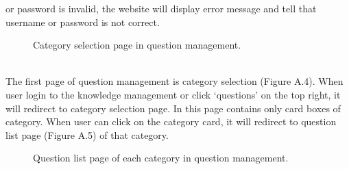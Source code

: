 \documentclass[12pt,oneside,openright,a4paper]{cpe-english-project}
\begin{document}
or password is invalid, the website will display error message and tell that username or 
password is not correct.
\begin{figure}[!h]\centering
{}
\caption{Category selection page in question management.
}\label{fig:Category selection page in question management.
}
\end{figure}\\

The first page of question management is category selection (Figure A.4). When user 
login to the knowledge management or click ‘questions’ on the top right, it will redirect to 
category selection page. In this page contains only card boxes of category. When user can 
click on the category card, it will redirect to question list page (Figure A.5) of that category.
\begin{figure}[!h]\centering
{}
\caption{Question list page of each category in question management.
}\label{fig:Question list page of each category in question management.
}
\end{figure}\\
\end{document}
